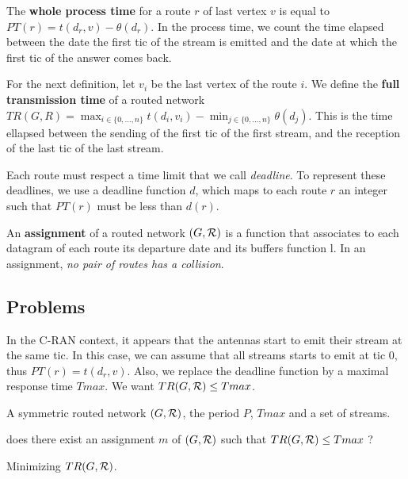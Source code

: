 \documentclass[french]{article}
\begin{document}
      The \textbf{whole process time} for a route $r$ of last vertex $v$ is equal to $PT(r)=t(d_r,v) - \theta(d_r) $.      
      In the process time, we count the time elapsed between the date the first tic of the stream is emitted and the date at which the first tic of the answer comes back. 
      
      For the next definition, let $v_i$ be the last vertex of the route $i$.
       We define the \textbf{full transmission time} of a routed network $TR(G,R) = \displaystyle \max_{i \in \{0,\ldots,n\}} t(d_i,v_i) - \displaystyle \min_{j \in \{0,\ldots,n\}} \theta(d_j)$. This is the time ellapsed between the sending of the first tic of the first stream, and the reception of the last tic of the last stream.
        
        
      Each route must respect a time limit that we call \emph{deadline}. To represent these deadlines, 
     we use a deadline function $d$, which maps to each route $r$ an integer such that $PT(r)$ must be less than $d(r)$.
  

        An {\bf assignment} of a routed network $(G,\cal R)$ is a function that associates to each datagram of each route its departure date and its buffers function l. In an assignment, \emph{no pair of routes has a collision}.
        
\subsection{Problems}
 In the C-RAN context, it appears that the antennas start to emit their stream at the same tic.
        In this case, we can assume that all streams starts to emit at tic $0$, thus $PT(r)= t(d_r,v)$.
        Also, we replace the deadline function by a maximal response time $Tmax$. We want $TR(G,{\cal R}) \leq Tmax$.
        
       

        A symmetric routed network $(G,{\cal R})$, the period $P$, $Tmax$ and a set of streams.
      
       does there exist an assignment $m$ of $(G,{\cal R})$ such that $ TR(G,{\cal R}) \leq Tmax$ ?

       Minimizing $TR(G,{\cal R})$.
    
\end{document}
